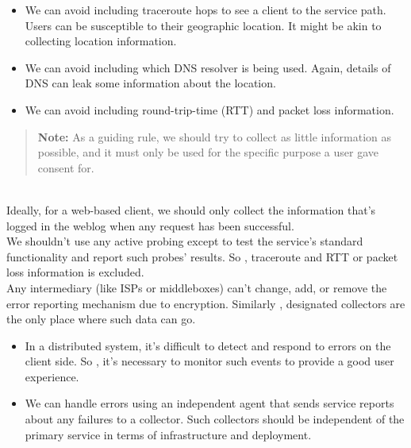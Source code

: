 \begin{itemize}
\item
\protect{}\label{qxZ0TY7pXv2kCHT2T-_eY}
We can avoid including traceroute hops to see a client to the service path. Users can be susceptible to their geographic location. It might be akin to collecting location information.
\item
\protect{}\label{BfNPhdL63YyqRSdV_GtEB}
We can avoid including which DNS resolver is being used. Again, details of DNS can leak some information about the location.
\item
\protect{}\label{yl7BrigeqTmN26xj4caGM}
We can avoid including round-trip-time (RTT) and packet loss information.
\end{itemize}
\begin{quote}
\textbf{Note:} As a guiding rule, we should try to collect as little information as possible, and it must only be used for the specific purpose a user gave consent for.
\end{quote}
\\
Ideally, for a web-based client, we should only collect the information that's logged in the weblog when any request has been successful.
\\
We shouldn't use any active probing except to test the service's standard functionality and report such probes' results. So , traceroute and RTT or packet loss information is excluded.
\\
Any intermediary (like ISPs or middleboxes) can't change, add, or remove the error reporting mechanism due to encryption. Similarly , designated collectors are the only place where such data can go.
\\

\begin{itemize}
\item
\protect{}\label{UTfOJ7175TKWCG4Ye54JD}
In a distributed system, it's difficult to detect and respond to errors on the client side. So , it's necessary to monitor such events to provide a good user experience.
\item
\protect{}\label{-cE8pwGh7NNPcJjY2S0eA}
We can handle errors using an independent agent that sends service reports about any failures to a collector. Such collectors should be independent of the primary service in terms of infrastructure and deployment.
\end{itemize}

